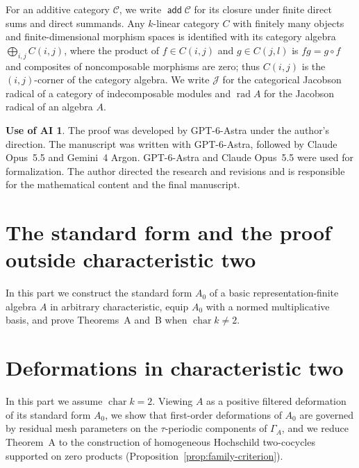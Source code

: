 \documentclass[a4paper,reqno,11pt]{amsart}
\theoremstyle{definition}
\newtheorem*{aiuse}{Use of AI}
\DeclareMathOperator{\add}{\mathsf{add}}
\DeclareMathOperator{\rad}{rad}
\DeclareMathOperator{\charac}{char}
\newcommand{\JJ}{\mathcal J}
\newcommand{\C}{\mathcal C}
\begin{document}
For an additive category $\C$, we write $\add\C$ for its closure under
finite direct sums and direct summands. Any $k$-linear category $C$ with
finitely many objects and finite-dimensional morphism spaces is identified
with its category algebra $\bigoplus_{i,j} C(i,j)$, where the product of
$f\in C(i,j)$ and $g\in C(j,l)$ is $fg=g\circ f$ and composites of
noncomposable morphisms are zero; thus $C(i,j)$ is the $(i,j)$-corner of the
category algebra. We write $\JJ$ for the categorical Jacobson radical of a
category of indecomposable modules and $\rad A$ for the Jacobson radical of
an algebra $A$.

\begin{aiuse}
The proof was developed by GPT-6-Astra under the author's direction.
The manuscript was written with GPT-6-Astra, followed by Claude Opus~5.5
and Gemini~4 Argon. GPT-6-Astra and Claude Opus~5.5 were used for
formalization. The author directed the research and revisions and is
responsible for the mathematical content and the final manuscript.
\end{aiuse}

\clearpage
\part{The standard form and the proof outside characteristic two}
\label{part:graded-form}

In this part we construct the standard form $A_0$ of a basic
representation-finite algebra $A$ in arbitrary characteristic, equip $A_0$
with a normed multiplicative basis, and prove Theorems~A and~B when
$\charac k\ne2$.






\clearpage
\part{Deformations in characteristic two}
\label{part:mesh-deformations}

In this part we assume $\charac k=2$. Viewing $A$ as a positive filtered
deformation of its standard form $A_0$, we show that first-order
deformations of $A_0$ are governed by residual mesh parameters on the
$\tau$-periodic components of $\Gamma_A$, and we reduce Theorem~A to the
construction of homogeneous Hochschild two-cocycles supported on zero
products (Proposition~\ref{prop:family-criterion}).




\end{document}
